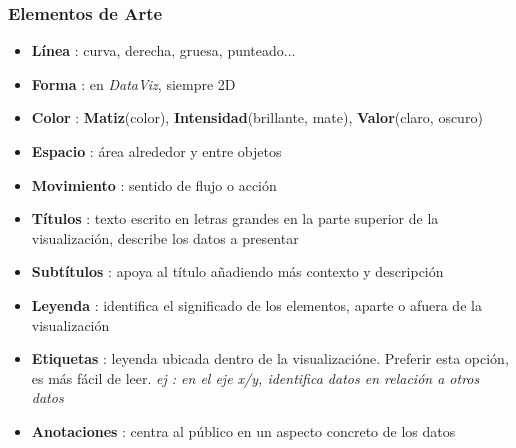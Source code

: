 \subsubsection{Elementos de Arte}
\begin{itemize}
    \item {\textbf{Línea} : curva, derecha, gruesa, punteado...}
    \item {\textbf{Forma} : en \textit{DataViz}, siempre 2D}
    \item {\textbf{Color} : \textbf{Matiz}(color), \textbf{Intensidad}(brillante, mate), \textbf{Valor}(claro, oscuro)}
    \item {\textbf{Espacio} : área alrededor y entre objetos}
    \item {\textbf{Movimiento} : sentido de flujo o acción}
    \item {\textbf{Títulos} : texto escrito en letras grandes en la parte superior de la visualización, describe los datos a presentar}
    \item {\textbf{Subtítulos} : apoya al título añadiendo más contexto y descripción}
    \item {\textbf{Leyenda} : identifica el significado de los elementos, aparte o afuera de la visualización}
    \item {\textbf{Etiquetas} : leyenda ubicada dentro de la visualizacióne. Preferir esta opción, es más fácil de leer. \textit{ej :  en el eje x/y, identifica datos en relación a otros datos}}
    \item {\textbf{Anotaciones} : centra al público en un aspecto concreto de los datos}
\end{itemize}

